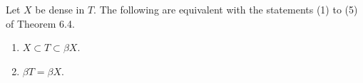 Let $X$ be dense in $T$. The following are equivalent with the statements (1) to (5) of Theorem 6.4.

\begin{enumerate}
\item[(6)] $X \subset T \subset \beta X$.
\item[(7)] $\beta T = \beta X$.
\end{enumerate}
